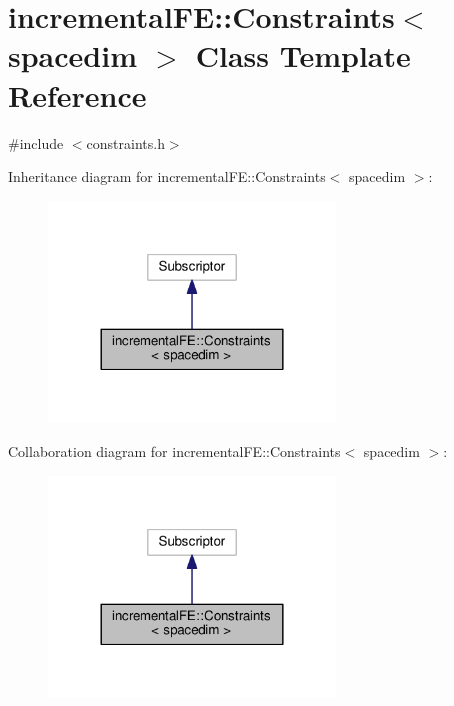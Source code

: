 \hypertarget{classincremental_f_e_1_1_constraints}{}\section{incremental\+FE\+:\+:Constraints$<$ spacedim $>$ Class Template Reference}
\label{classincremental_f_e_1_1_constraints}


{\ttfamily \#include $<$constraints.\+h$>$}



Inheritance diagram for incremental\+FE\+:\+:Constraints$<$ spacedim $>$\+:\nopagebreak
\begin{figure}[H]
\begin{center}
\leavevmode
\includegraphics[width=216pt]{classincremental_f_e_1_1_constraints__inherit__graph}
\end{center}
\end{figure}


Collaboration diagram for incremental\+FE\+:\+:Constraints$<$ spacedim $>$\+:\nopagebreak
\begin{figure}[H]
\begin{center}
\leavevmode
\includegraphics[width=216pt]{classincremental_f_e_1_1_constraints__coll__graph}
\end{center}
\end{figure}
